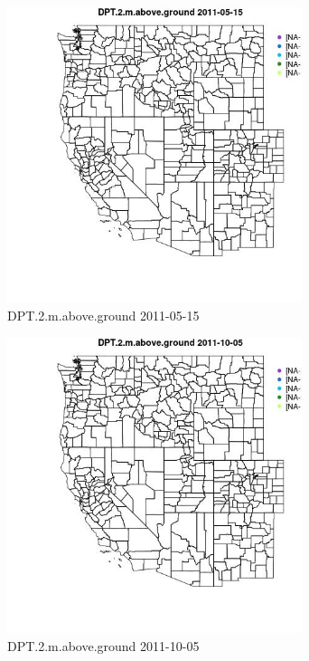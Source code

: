 \begin{figure} 
\centering  
\includegraphics[width=0.77\textwidth]{Code_Outputs/ML_input_report_ML_input_PM25_Step5_part_d_de_duplicated_aves_ML_input_MapObsDPT2maboveground2011-05-15.jpg} 
\caption{\label{fig:ML_input_report_ML_input_PM25_Step5_part_d_de_duplicated_aves_ML_inputMapObsDPT2maboveground2011-05-15}DPT.2.m.above.ground 2011-05-15} 
\end{figure} 
 

\begin{figure} 
\centering  
\includegraphics[width=0.77\textwidth]{Code_Outputs/ML_input_report_ML_input_PM25_Step5_part_d_de_duplicated_aves_ML_input_MapObsDPT2maboveground2011-10-05.jpg} 
\caption{\label{fig:ML_input_report_ML_input_PM25_Step5_part_d_de_duplicated_aves_ML_inputMapObsDPT2maboveground2011-10-05}DPT.2.m.above.ground 2011-10-05} 
\end{figure} 
 

